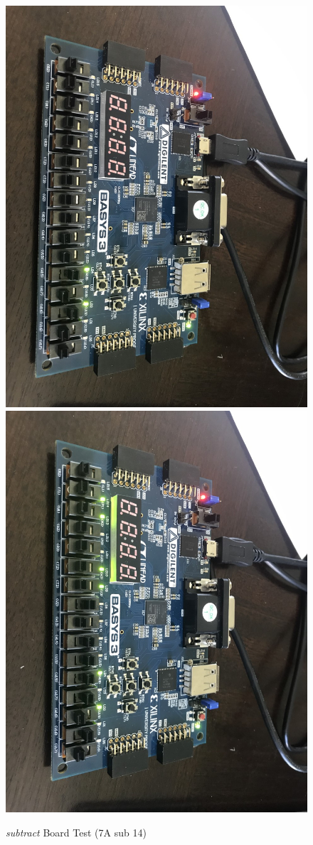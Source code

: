 \documentclass[11pt]{article}
\begin{document}
\begin{figure}[ht]\centering
	\includegraphics[angle=90, width=.8\textwidth]{sub1}
	\includegraphics[angle=90, width=.8\textwidth]{sub2}
	\caption{\textit{subtract} Board Test (7A sub 14)}
	\label{fig:sim_with_table}
\end{figure}
\end{document}
